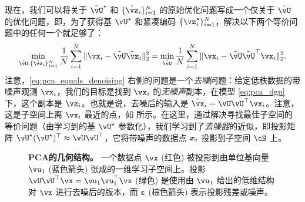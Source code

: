 \documentclass[../../book-main_zh.tex]{subfiles}
\begin{document}
现在，我们可以将关于 \(\tilde{\vU}^{\star}\) 和 \(\{\tilde{\vz}_{i}\}_{i = 1}^{N}\) 的原始优化问题写成一个仅关于 \(\tilde{\vU}\) 的优化问题，即，为了获得基 \(\vU^{\star}\) 和紧凑编码 \(\{\vz_{i}^{\star}\}_{i = 1}^{N}\)，解决以下两个等价问题中的任何一个就足够了：
\begin{equation}\label{eq:pca_equals_denoising}
    \min_{\tilde{\vU}, \{\tilde{\vz}_{i}\}_{i = 1}^{N}}\frac{1}{N}\sum_{i = 1}^{N}\norm{\vx_{i} - \tilde{\vU}\tilde{\vz}_{i}}_{2}^{2} = \min_{\tilde{\vU}}\frac{1}{N}\sum_{i = 1}^{N}\norm{\vx_{i} - \tilde{\vU}\tilde{\vU}^{\top}\vx_{i}}_{2}^{2}.
\end{equation}
注意，\eqref{eq:pca_equals_denoising} 右侧的问题是一个\textit{去噪}问题：给定低秩数据的带噪声观测 \(\vx_{i}\)，我们的目标是找到 \(\vx_{i}\) 的\textit{无噪声}副本，在模型 \eqref{eq:pca_dgp} 下，这个副本是 $\vz_{i}$。也就是说，去噪后的输入是 $\hat{\vx}_i = \vU\vU^\top \vx_i$。注意，这是子空间上离 $\vx_i$ 最近的点，如  所示。在这里，通过解决寻找最佳子空间的等价问题（由学习到的基 \(\vU^{\star}\) 参数化），我们学习到了\textit{去噪器}的近似，即投影矩阵 \(\vU^{\star}(\vU^{\star})^{\top} \approx \vU\vU^{\top}\)，它将带噪声的数据点 $\bm{x}_i$ 投影到子空间 \(\cS\) 上。%

\begin{figure}
    \centering
    \caption{\small \textbf{PCA的几何结构。} 一个数据点 $\vx$ (红色) 被投影到由单位基向量 $\vu_1$ (蓝色箭头) 张成的一维学习子空间上。投影 $\vU\vU^\top\vx = \vu_{1}\vu_{1}^{\top}\vx$ (绿色) 是使用由 $\vu_{1}$ 给出的低维结构对 $\vx$ 进行去噪后的版本，而 $\boldsymbol{\varepsilon}$ (棕色箭头) 表示投影残差或噪声。}
    \label{fig:pca-geometry}
\end{figure}
\end{document}
